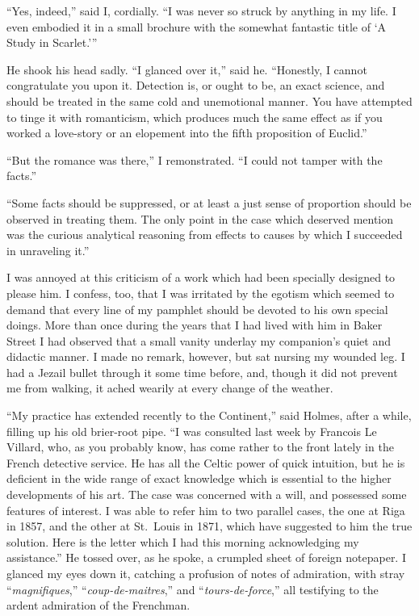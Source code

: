 \documentclass[12pt,english,oneside]{book}
\begin{document}
{}``Yes, indeed,'' said I, cordially. {}``I was never so struck
by anything in my life. I even embodied it in a small brochure with
the somewhat fantastic title of `A Study in Scarlet.'''

He shook his head sadly. {}``I glanced over it,'' said he. {}``Honestly,
I cannot congratulate you upon it. Detection is, or ought to be, an
exact science, and should be treated in the same cold and unemotional
manner. You have attempted to tinge it with romanticism, which produces
much the same effect as if you worked a love-story or an elopement
into the fifth proposition of Euclid.''

{}``But the romance was there,'' I remonstrated. {}``I could not
tamper with the facts.''

{}``Some facts should be suppressed, or at least a just sense of
proportion should be observed in treating them. The only point in
the case which deserved mention was the curious analytical reasoning
from effects to causes by which I succeeded in unraveling it.''

I was annoyed at this criticism of a work which had been specially
designed to please him. I confess, too, that I was irritated by the
egotism which seemed to demand that every line of my pamphlet should
be devoted to his own special doings. More than once during the years
that I had lived with him in Baker Street I had observed that a small
vanity underlay my companion's quiet and didactic manner. I made no
remark, however, but sat nursing my wounded leg. I had a Jezail bullet
through it some time before, and, though it did not prevent me from
walking, it ached wearily at every change of the weather.

{}``My practice has extended recently to the Continent,'' said Holmes,
after a while, filling up his old brier-root pipe. {}``I was consulted
last week by Francois Le Villard, who, as you probably know, has come
rather to the front lately in the French detective service. He has
all the Celtic power of quick intuition, but he is deficient in the
wide range of exact knowledge which is essential to the higher developments
of his art. The case was concerned with a will, and possessed some
features of interest. I was able to refer him to two parallel cases,
the one at Riga in 1857, and the other at St.\ Louis in 1871, which
have suggested to him the true solution. Here is the letter which
I had this morning acknowledging my assistance.'' He tossed over,
as he spoke, a crumpled sheet of foreign notepaper. I glanced my eyes
down it, catching a profusion of notes of admiration, with stray {}``\emph{magnifiques},''
{}``\emph{coup-de-maitres},'' and {}``\emph{tours-de-force},''
all testifying to the ardent admiration of the Frenchman.
\end{document}
